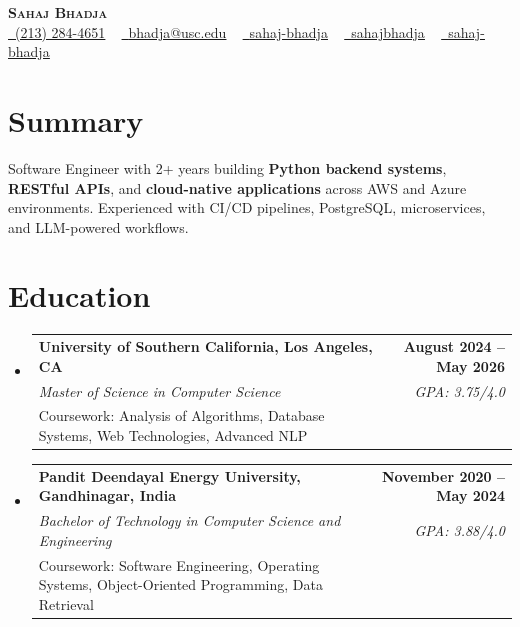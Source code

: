 \documentclass[letterpaper,10pt]{article}
\makeatletter
\newcommand{\resumeEduSubheading}[5]{\vspace{-1pt}\item\begin{tabular*}{1.0\textwidth}[t]{l@{\extracolsep{\fill}}r}\textbf{#1} & \textbf{\small #2} \\\textit{\small #3} & \textit{\small #4} \\\small #5 & \\\end{tabular*}\vspace{-4pt}}
\newcommand{\resumeSubHeadingListStart}{\begin{itemize}[leftmargin=0.0in, label={}]}
\newcommand{\resumeSubHeadingListEnd}{\end{itemize}}
\makeatother
\begin{document}
\begin{center}
{\Huge \scshape \textbf{Sahaj Bhadja}} \\ \vspace{1pt}
\small \href{tel:(213) 284-4651}{\faPhone\ \underline{(213) 284-4651}} ~ \href{mailto:bhadja@usc.edu}{\raisebox{-0.2\height}\faEnvelope\ \underline{bhadja@usc.edu}} ~
\href{https://www.linkedin.com/in/sahaj-bhadja/}{\raisebox{-0.2\height}\faLinkedin\ \underline{sahaj-bhadja}} ~ \href{https://github.com/SAHAJ-BHADJA}{\raisebox{-0.2\height}\faGithub\ \underline{sahajbhadja}} ~
\href{https://sahaj-bhadja.vercel.app/}{\raisebox{-0.2\height}\faGlobe\ \underline{sahaj-bhadja}}
\end{center}
\vspace{-18pt}
\section{Summary}
\begin{itemize}[leftmargin=0.15in, label={}]
\small{\item{Software Engineer with 2+ years building \textbf{Python backend systems}, \textbf{RESTful APIs}, and \textbf{cloud-native applications} across AWS and Azure environments. Experienced with CI/CD pipelines, PostgreSQL, microservices, and LLM-powered workflows.}}
\end{itemize}
\vspace{-16pt}
\section{Education}
\resumeSubHeadingListStart
\resumeEduSubheading{University of Southern California, Los Angeles, CA}{August 2024 -- May 2026}{Master of Science in Computer Science}{GPA: 3.75/4.0}{Coursework: Analysis of Algorithms, Database Systems, Web Technologies, Advanced NLP}
\vspace{-9pt}
\resumeEduSubheading{Pandit Deendayal Energy University, Gandhinagar, India}{November 2020 -- May 2024}{Bachelor of Technology in Computer Science and Engineering}{GPA: 3.88/4.0}{Coursework: Software Engineering, Operating Systems, Object-Oriented Programming, Data Retrieval}
\resumeSubHeadingListEnd
\vspace{-14pt}
\end{document}
